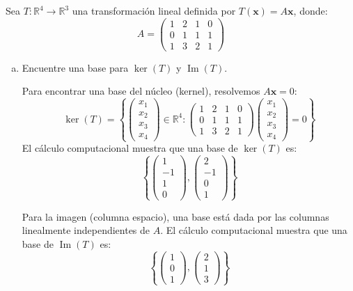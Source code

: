 \begin{prob}
Sea $T: \mathbb{R}^4 \to \mathbb{R}^3$ una transformación lineal definida por $T(\mathbf{x}) = A\mathbf{x}$, donde:
\[
A = \begin{pmatrix} 1 & 2 & 1 & 0 \\ 0 & 1 & 1 & 1 \\ 1 & 3 & 2 & 1 \end{pmatrix}
\]

\begin{enumerate}[(a)]
\item Encuentre una base para $\ker(T)$ y $\operatorname{Im}(T)$.
\begin{myproof}
Para encontrar una base del núcleo (kernel), resolvemos $A\mathbf{x} = 0$:
\[
\ker(T) = \left\{ \begin{pmatrix} x_1 \\ x_2 \\ x_3 \\ x_4 \end{pmatrix} \in \mathbb{R}^4 : 
\begin{pmatrix} 1 & 2 & 1 & 0 \\ 0 & 1 & 1 & 1 \\ 1 & 3 & 2 & 1 \end{pmatrix} 
\begin{pmatrix} x_1 \\ x_2 \\ x_3 \\ x_4 \end{pmatrix} = 0 \right\}
\]
El cálculo computacional muestra que una base de $\ker(T)$ es:
\[
\left\{
\begin{pmatrix} 1 \\ -1 \\ 1 \\ 0 \end{pmatrix},
\begin{pmatrix} 2 \\ -1 \\ 0 \\ 1 \end{pmatrix}
\right\}
\]

Para la imagen (columna espacio), una base está dada por las columnas linealmente independientes de $A$. El cálculo computacional muestra que una base de $\operatorname{Im}(T)$ es:
\[
\left\{
\begin{pmatrix} 1 \\ 0 \\ 1 \end{pmatrix},
\begin{pmatrix} 2 \\ 1 \\ 3 \end{pmatrix}
\right\}
\]
\end{myproof}


\end{enumerate}
\end{prob}
